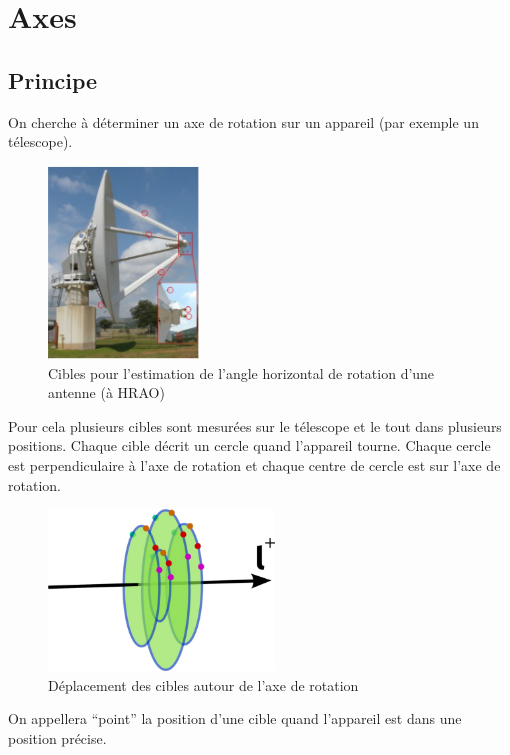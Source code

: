 \documentclass[french]{report}
\begin{document}
\section{Axes}

\subsection{Principe}

On cherche à déterminer un axe de rotation sur un appareil (par exemple un télescope).

\begin{figure}[h]
\centering
\includegraphics[width = 4cm]{images/axis0}
\caption{Cibles pour l'estimation de l'angle horizontal de rotation d'une antenne (à HRAO)}
\end{figure}


Pour cela plusieurs cibles sont mesurées sur le télescope et le tout dans plusieurs positions.
Chaque cible décrit un cercle quand l'appareil tourne. Chaque cercle est perpendiculaire à l'axe de rotation et chaque centre de cercle est sur l'axe de rotation.

\begin{figure}[h]
\centering
\includegraphics[width = 6cm]{images/axis1}
\caption{Déplacement des cibles autour de l'axe de rotation}
\end{figure}


On appellera ``point'' la position d'une cible quand l'appareil est dans une position précise.
\end{document}
